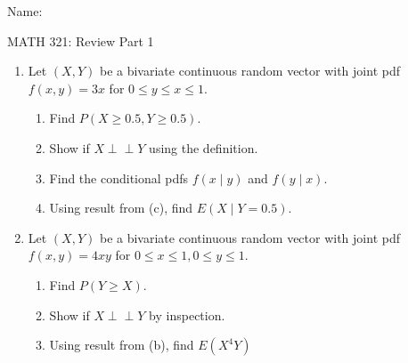 \documentclass{article}
\newcommand{\ind}{\perp \!\!\! \perp}			%
\begin{document}
\hspace{375pt}Name:

\begin{center}
{\Huge MATH 321: Review Part 1}

\end{center}


\bigskip\bigskip

\begin{enumerate}
    \item Let $(X,Y)$ be a bivariate continuous random vector with joint pdf \\ $\displaystyle f(x,y) = 3x$ \quad for $0 \le y \le x \le 1$.%
    \begin{enumerate}
        \item Find $P(X \ge 0.5, Y \ge 0.5)$.\vspace{175pt}
        \item Show if $X \ind Y$ using the definition.\vspace{140pt}
        \item Find the conditional pdfs $f(x \mid y)$ and $f(y \mid x)$.\vspace{120pt}
        \item Using result from (c), find $E(X \mid Y = 0.5)$.\vspace{100pt}
    \end{enumerate}\bigskip
    
    \item Let $(X,Y)$ be a bivariate continuous random vector with joint pdf \\ $\displaystyle f(x,y) = 4xy$ \quad for $0 \le x \le 1, 0 \le y \le 1$.%
    \begin{enumerate}
        \item Find $P(Y \ge X)$.\vspace{175pt}
        \item Show if $X \ind Y$ by inspection.\vspace{70pt}
        \item Using result from (b), find $E(X^4 Y)$\vspace{150pt}
    \end{enumerate}\bigskip
    

\end{enumerate}
\end{document}
